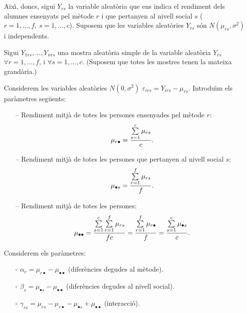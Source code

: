 Aix\'{\i}, doncs, sigui $Y_{rs}$ la variable aleat\`oria que ens indica el rendiment dels
alumnes ensenyats pel m\`etode $r$ i que pertanyen al nivell social $s$ ($r = 1,
\ldots , f, \ s = 1, \ldots , c$). Suposem que les variables aleat\`ories $Y_{rs}$
s\'on $N(\mu_{rs},\sigma^2)$ i independents.

Sigui $Y_{1rs}, \ldots , Y_{nrs}$ una mostra aleat\`oria simple de la variable
aleat\`oria $Y_{rs}$\break $\forall r = 1, \ldots , f$, i $ \forall s = 1, \ldots , c$.
(Suposem que totes les mostres tenen la mateixa grand\`aria.)

Considerem les variables aleat\`ories $N(0,\sigma^2)$ $\varepsilon_{irs} = Y_{irs}
- \mu_{rs}$. Introdu\"{\i}m els par\`ametres seg\"uents:

\begin{itemize}
\item[--] Rendiment mitj\`a de totes les persones ensenyades pel m\`etode $r$:
$$\mu_{r\bullet} = {\sum\limits_{s=1}^c \mu_{rs} \over c}.$$

\item[--] Rendiment mitj\`a de totes les persones que pertanyen al nivell social $s$:
$$\mu_{\bullet s} = {\sum\limits_{r=1}^f \mu_{rs} \over f}.$$

\item[--] Rendiment mitj\`a de totes les persones:
$$\mu_{\bullet\bullet} = {\sum\limits_{s=1}^c \sum\limits_{r=1}^f \mu_{rs} \over f c} =
{\sum\limits_{r=1}^f \mu_{r\bullet} \over f} = {\sum\limits_{s=1}^c \mu_{\bullet s} \over c}.$$
\end{itemize}

Considerem els par\`ametres:
\begin{itemize}
\item[-] $\alpha_r = \mu_{r\bullet} - \mu_{\bullet\bullet}$ (difer\`encies degudes al m\`etode).

\item[-] $\beta_s = \mu_{\bullet s} - \mu_{\bullet\bullet}$ (difer\`encies degudes al nivell social).

\item[-] $\gamma_{rs} = \mu_{rs} - \mu_{r\bullet} - \mu_{\bullet s} + \mu_{\bullet\bullet}$ 
(interacci\'o).
\end{itemize}

